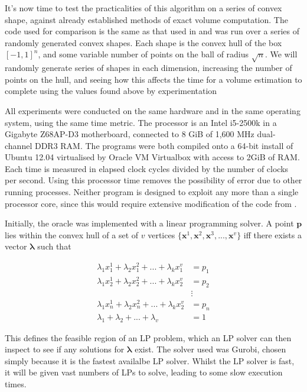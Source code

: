 It's now time to test the practicalities of this algorithm on a series of convex shape, against already established methods of exact volume computation. The code used for comparison is the same as that used in %
and was run over a series of randomly generated convex shapes. Each shape is the convex hull of the box $[-1,1]^n$, and some variable number of points on the ball of radius $\sqrt n$. We will randomly generate series of shapes in each dimension, increasing the number of points on the hull, and seeing how this affects the time for a volume estimation to complete using the values found above by experimentation

All experiments were conducted on the same hardware and in the same operating system, using the same time metric. The processor is an Intel i5-2500k in a Gigabyte Z68AP-D3 motherboard, connected to 8 GiB of 1,600 MHz dual-channel DDR3 RAM. The programs were both compiled onto a 64-bit install of Ubuntu 12.04 virtualised by Oracle VM Virtualbox with access to 2GiB of RAM. Each time is measured in elapsed clock cycles divided by the number of clocks per second. Using this processor time removes the possibility of error due to other running processes. Neither program is designed to exploit any more than a single processor core, since this would require extensive modification of the code from %
.

Initially, the oracle was implemented with a linear programming solver. A point ${\bm p}$ lies within the convex hull of a set of $v$ vertices $\{{\bm x}^1, {\bm x}^2, {\bm x}^3, ..., {\bm x}^v\}$ iff there exists a vector ${\bm \lambda}$ such that

\begin{align*}
\lambda_1 x^1_1 + \lambda_2 x^2_1 + ... + \lambda_k x^v_1 &= p_1 \\
\lambda_1 x^1_2 + \lambda_2 x^2_2 + ... + \lambda_k x^v_2 &= p_2 \\
&\vdots \\
\lambda_1 x^1_n + \lambda_2 x^2_n + ... + \lambda_k x^v_2 &= p_n \\
\lambda_1 + \lambda_2 + ... + \lambda_v &= 1
\end{align*}

This defines the feasible region of an LP problem, which an LP solver can then inspect to see if any solutions for ${\bm \lambda}$ exist. The solver used was Gurobi, chosen simply because it is the fastest availalbe LP solver. Whilst the LP solver is fast, it will be given vast numbers of LPs to solve, leading to some slow execution times.

